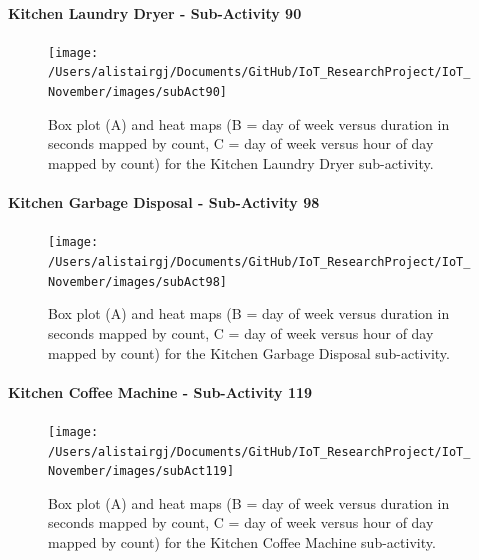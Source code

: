 \documentclass[11pt,]{article}
\let\oldparagraph\paragraph
\renewcommand{\paragraph}[1]{\oldparagraph{#1}\mbox{}}
\begin{document}
\hypertarget{kitchen-laundry-dryer---sub-activity-90}{%
\paragraph{Kitchen Laundry Dryer - Sub-Activity
90}\label{kitchen-laundry-dryer---sub-activity-90}}

\begin{figure}[H]

{\centering \texttt{[image: /Users/alistairgj/Documents/GitHub/IoT\_ResearchProject/IoT\_November/images/subAct90]} 

}

\caption{Box plot (A) and heat maps (B = day of week versus duration in seconds mapped by count, C = day of week versus hour of day mapped by count) for the Kitchen Laundry Dryer sub-activity.}\label{fig:subAct90}
\end{figure}

\hypertarget{kitchen-garbage-disposal---sub-activity-98}{%
\paragraph{Kitchen Garbage Disposal - Sub-Activity
98}\label{kitchen-garbage-disposal---sub-activity-98}}

\begin{figure}[H]

{\centering \texttt{[image: /Users/alistairgj/Documents/GitHub/IoT\_ResearchProject/IoT\_November/images/subAct98]} 

}

\caption{Box plot (A) and heat maps (B = day of week versus duration in seconds mapped by count, C = day of week versus hour of day mapped by count) for the Kitchen Garbage Disposal sub-activity.}\label{fig:subAct98}
\end{figure}

\hypertarget{kitchen-coffee-machine---sub-activity-119}{%
\paragraph{Kitchen Coffee Machine - Sub-Activity
119}\label{kitchen-coffee-machine---sub-activity-119}}

\begin{figure}[H]

{\centering \texttt{[image: /Users/alistairgj/Documents/GitHub/IoT\_ResearchProject/IoT\_November/images/subAct119]} 

}

\caption{Box plot (A) and heat maps (B = day of week versus duration in seconds mapped by count, C = day of week versus hour of day mapped by count) for the Kitchen Coffee Machine sub-activity.}\label{fig:subAct119}
\end{figure}
\end{document}
